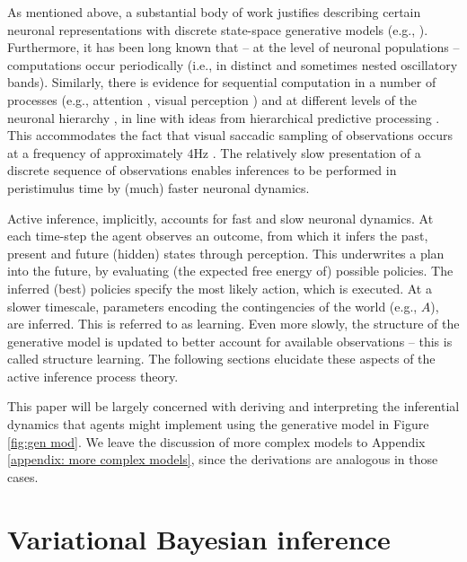 \documentclass[review,12pt,authoryear]{elsarticle}
\begin{document}
As mentioned above, a substantial body of work justifies describing certain neuronal representations with discrete state-space generative models (e.g., \citep{zhangDiscreteFixedResolutionRepresentations2008,luckCapacityVisualWorking1997,teeInformationBrainRepresented2018}). Furthermore, it has been long known that -- at the level of neuronal populations -- computations occur periodically (i.e., in distinct and sometimes nested oscillatory bands). Similarly, there is evidence for sequential computation in a number of processes (e.g., attention \citep{buschmanShiftingSpotlightAttention2010,duncanDirectMeasurementAttentional1994,landauAttentionSamplesStimuli2012}, visual perception \citep{hanslmayrPrestimulusOscillatoryPhase2013,rollsProcessingSpeedCerebral1994}) and at different levels of the neuronal hierarchy \citep{fristonDeepTemporalModels2018,fristonHierarchicalModelsBrain2008}, in line with ideas from hierarchical predictive processing \citep{chaoLargeScaleCorticalNetworks2018,iglesiasHierarchicalPredictionErrors2013}. This accommodates the fact that visual saccadic sampling of observations occurs at a frequency of approximately $4$Hz \citep{parrDiscreteContinuousBrain2018}. The relatively slow presentation of a discrete sequence of observations enables inferences to be performed in peristimulus time by (much) faster neuronal dynamics.

Active inference, implicitly, accounts for fast and slow neuronal dynamics. At each time-step the agent observes an outcome, from which it infers the past, present and future (hidden) states through perception. This underwrites a plan into the future, by evaluating (the expected free energy of) possible policies. The inferred (best) policies specify the most likely action, which is executed. At a slower timescale, parameters encoding the contingencies of the world (e.g., $A$), are inferred. This is referred to as learning. Even more slowly, the structure of the generative model is updated to better account for available observations -- this is called structure learning. The following sections elucidate these aspects of the active inference process theory.

This paper will be largely concerned with deriving and interpreting the inferential dynamics that agents might implement using the generative model in Figure \ref{fig:gen mod}. We leave the discussion of more complex models to Appendix \ref{appendix: more complex models}, since the derivations are analogous in those cases.

\section{Variational Bayesian inference}
\label{sec: VB}
\end{document}

